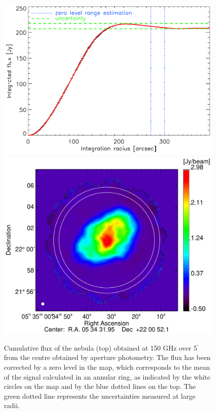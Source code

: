 \documentclass[twocolumn,traditabstract]{aa}
\begin{document}
\begin{figure}[h!]
  \centering
  \includegraphics[width=0.7\linewidth,keepaspectratio]{figures/Crab_integrated_flux_2mm.pdf}
  \includegraphics[width=0.8\linewidth,keepaspectratio]{figures/Crab_I_v3_2mm_ring.pdf}
     \caption{
       Cumulative flux of the  nebula (top) obtained at 150 GHz over
       5$^{\prime}$ from the centre obtained by aperture photometry. The flux
       has been corrected by a zero level in the map, which corresponds to the
       mean of the signal calculated in an annular ring, as indicated by the
       white circles on the map and by the blue dotted lines on the
       top. The green dotted line represents the uncertainties measured at large
       radii.}
\label{crab_integrated_flux}
\end{figure}
\end{document}
